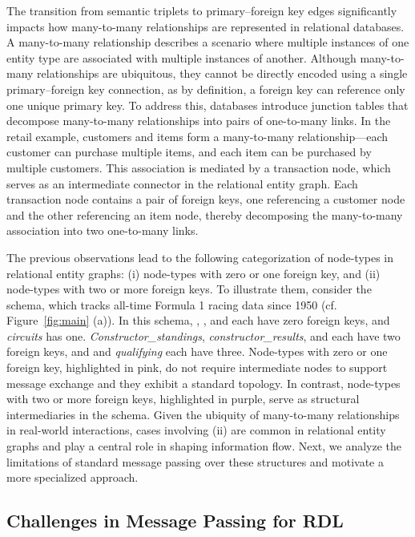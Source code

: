\documentclass{article}
\theoremstyle{plain}
\theoremstyle{definition}
\theoremstyle{remark}
\begin{document}
\vspace{-5pt}
  The transition from semantic triplets to primary–foreign key edges significantly impacts how many-to-many relationships are represented in relational databases. A many-to-many relationship describes a scenario where multiple instances of one entity type are associated with multiple instances of another. Although many-to-many relationships are ubiquitous, they cannot be directly encoded using a single primary–foreign key connection, as by definition, a foreign key can reference only one unique primary key. To address this, databases introduce junction tables that decompose many-to-many relationships into pairs of one-to-many links. 
In the retail example, customers and items form a many-to-many relationship—each customer can purchase multiple items, and each item can be purchased by multiple customers. This association is mediated by a transaction node, which serves as an intermediate connector in the relational entity graph. Each transaction node contains a pair of foreign keys, one referencing a customer node and the other referencing an item node, thereby decomposing the many-to-many association into two one-to-many links.

The previous observations lead to the following categorization of node-types in relational entity graphs: (i) node-types with zero or one foreign key, and  (ii) node-types with two or more foreign keys. 
To illustrate them, consider the \fone schema, which tracks all-time Formula 1 racing data since 1950 (cf. Figure~\ref{fig:main} (a)). In this schema, \constructor, \race, and \driver each have zero foreign keys, and \textit{circuits} has one. \textit{Constructor\_standings}, \textit{constructor\_results}, and \standing each have two foreign keys, and \res and \textit{qualifying} each have three. Node-types with zero or one foreign key, highlighted in pink, do not require intermediate nodes to support message exchange and they exhibit a standard topology. In contrast, node-types with two or more foreign keys, highlighted in purple, serve as structural intermediaries in the schema. Given the ubiquity of many-to-many relationships in real-world interactions, cases involving (ii) are common in relational entity graphs and play a central role in shaping information flow. Next, we analyze the limitations of standard message passing over these structures and motivate a more specialized approach.
\subsection{Challenges in Message Passing for RDL}\label{sec: method-challenge}
\end{document}
